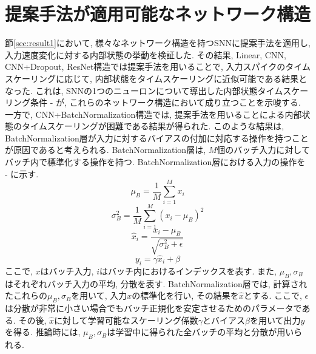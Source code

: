 \section{提案手法が適用可能なネットワーク構造}
節\ref{sec:result1}において, 様々なネットワーク構造を持つSNNに提案手法を適用し, 入力速度変化に対する内部状態の挙動を検証した.
その結果, Linear, CNN, CNN+Dropout, ResNet構造では提案手法を用いることで, 入力スパイクのタイムスケーリングに応じて, 内部状態をタイムスケーリングに近似可能である結果となった.
これは, SNNの1つのニューロンについて導出した内部状態タイムスケーリング条件 - が, これらのネットワーク構造において成り立つことを示唆する.
一方で, CNN+BatchNormalization構造では, 提案手法を用いることによる内部状態のタイムスケーリングが困難である結果が得られた.
このような結果は, BatchNormalization層が入力に対するバイアスの付加に対応する操作を持つことが原因であると考えられる.
BatchNormalization層は, $M$個のバッチ入力に対してバッチ内で標準化する操作を持つ.
BatchNormalization層における入力の操作を - に示す.
\begin{equation}
    \mu_B=\frac{1}{M}\sum_{i=1}^{M}x_i \label{eq:batchnormalization:input:mean}
\end{equation}
\begin{equation}
    \sigma_B^2=\frac{1}{M}\sum_{i=1}^{M}(x_i-\mu_B)^2 \label{eq:batchnormalization:input:variance}
\end{equation}
\begin{equation}
    \hat{x}_i=\frac{x_i-\mu_B}{\sqrt{\sigma_B^2+\epsilon}} \label{eq:batchnormalization:input:standardization}
\end{equation}
\begin{equation}
    y_i=\gamma\hat{x}_i+\beta \label{eq:batchnormalization:input:output}
\end{equation}
ここで, $x$はバッチ入力, $i$はバッチ内におけるインデックスを表す.
また, $\mu_B, \sigma_B$はそれぞれバッチ入力の平均, 分散を表す.
BatchNormalization層では, 計算されたこれらの$\mu_B, \sigma_B$を用いて, 入力$x$の標準化を行い, その結果を$\hat{x}$とする.
ここで, $\epsilon$は分散が非常に小さい場合でもバッチ正規化を安定させるためのパラメータである.
その後, $\hat{x}$に対して学習可能なスケーリング係数$\gamma$とバイアス$\beta$を用いて出力$y$を得る.
推論時には, $\mu_B, \sigma_B$は学習中に得られた全バッチの平均と分散が用いられる.


